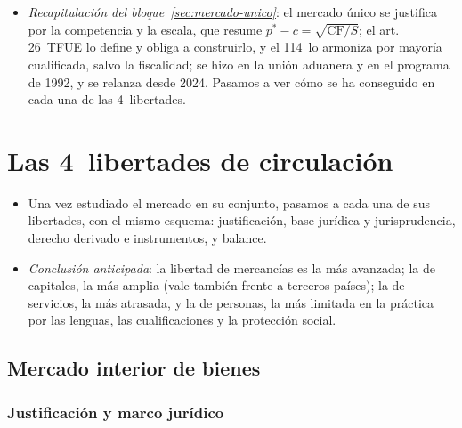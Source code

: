 \documentclass[11pt]{article}
\begin{document}
\begin{itemize}
\item \emph{Recapitulación del bloque~\ref{sec:mercado-unico}}: el mercado único se justifica por la competencia y la escala, que resume $p^{*}-c=\sqrt{\mathrm{CF}/S}$; el art. 26~TFUE lo define y obliga a construirlo, y el 114~lo armoniza por mayoría cualificada, salvo la fiscalidad; se hizo en la unión aduanera y en el programa de 1992, y se relanza desde 2024. Pasamos a ver cómo se ha conseguido en cada una de las 4~libertades.
\end{itemize}

\section{Las 4~libertades de circulación}\label{sec:libertades}

\begin{itemize}
\item Una vez estudiado el mercado en su conjunto, pasamos a cada una de sus libertades, con el mismo esquema: justificación, base jurídica y jurisprudencia, derecho derivado e instrumentos, y balance.
\item \emph{Conclusión anticipada}: la libertad de mercancías es la más avanzada; la de capitales, la más amplia (vale también frente a terceros países); la de servicios, la más atrasada, y la de personas, la más limitada en la práctica por las lenguas, las cualificaciones y la protección social.
\end{itemize}

\subsection{Mercado interior de bienes}\label{sec:bienes}

\subsubsection{Justificación y marco jurídico}\label{sec:bienes-marco}
\end{document}
